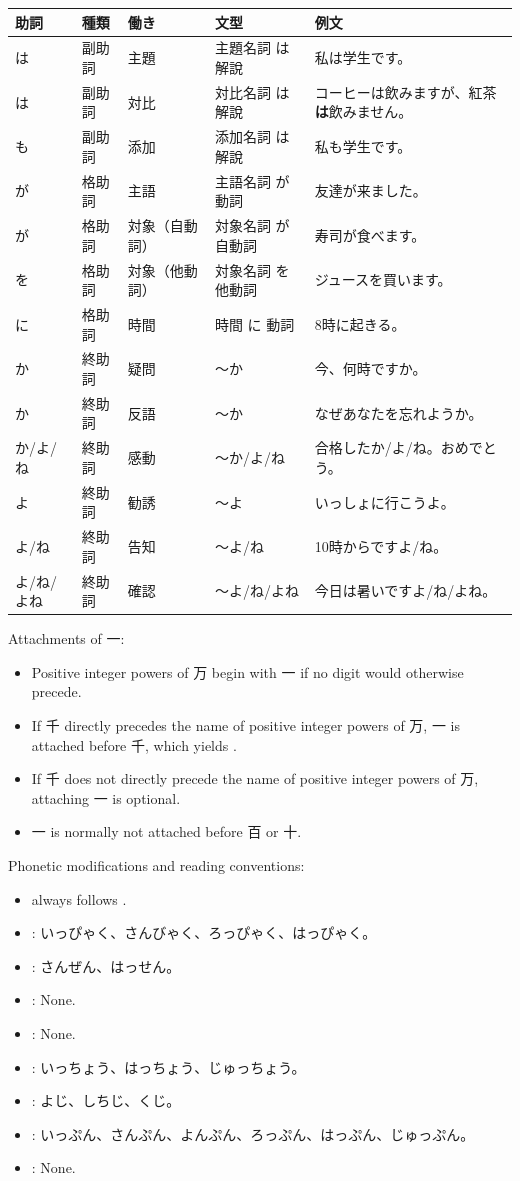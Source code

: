 \documentclass[a4paper,12pt]{article}
\begin{document}
\begin{longtable}[c]{|C{0.1\textwidth}|C{0.1\textwidth}|C{0.2\textwidth}|C{0.2\textwidth}|C{0.2\textwidth}|}
\hline
助詞 & 種類 & 働き & 文型 & 例文 \\\hline
は & 副助詞 & 主題 & 主題名詞 は 解說 & 私は学生です。 \\\hline
は & 副助詞 & 対比 & 対比名詞 は 解說 & コーヒーは飲みますが、紅茶\textbf{は}飲みません。 \\\hline
も & 副助詞 & 添加 & 添加名詞 は 解說 & 私も学生です。 \\\hline
が & 格助詞 & 主語 & 主語名詞 が 動詞 & 友達が来ました。 \\\hline
が & 格助詞 & 対象（自動詞） & 対象名詞 が 自動詞 & 寿司が食べます。 \\\hline
を & 格助詞 & 対象（他動詞） & 対象名詞 を 他動詞 & ジュースを買います。 \\\hline
に & 格助詞 & 時間 & 時間 に 動詞 & 8時に起きる。 \\\hline
か & 終助詞 & 疑問 & 〜か & 今、何時ですか。 \\\hline
か & 終助詞 & 反語 & 〜か & なぜあなたを忘れようか。 \\\hline
か/よ/ね & 終助詞 & 感動 & 〜か/よ/ね & 合格したか/よ/ね。おめでとう。 \\\hline
よ & 終助詞 & 勧誘 & 〜よ & いっしょに行こうよ。 \\\hline
よ/ね & 終助詞 & 告知 & 〜よ/ね & 10時からですよ/ね。 \\\hline
よ/ね/よね & 終助詞 & 確認 & 〜よ/ね/よね & 今日は暑いですよ/ね/よね。 \\\hline
\end{longtable}
Attachments of 一:
\begin{itemize}
\item Positive integer powers of 万 begin with 一 if no digit would otherwise precede.
\item If 千 directly precedes the name of positive integer powers of 万, 一 is attached before 千, which yields .
\item If 千 does not directly precede the name of positive integer powers of 万, attaching 一 is optional.
\item 一 is normally not attached before 百 or 十.
\end{itemize}
Phonetic modifications and reading conventions:
\begin{itemize}
\item {} always follows .
\item {}: いっぴゃく、さんびゃく、ろっぴゃく、はっぴゃく。
\item {}: さんぜん、はっせん。
\item {}: None.
\item {}: None.
\item {}: いっちょう、はっちょう、じゅっちょう。
\item {}: よじ、しちじ、くじ。
\item {}: いっぷん、さんぷん、よんぷん、ろっぷん、はっぷん、じゅっぷん。
\item {}: None.
\end{itemize}
\end{document}
